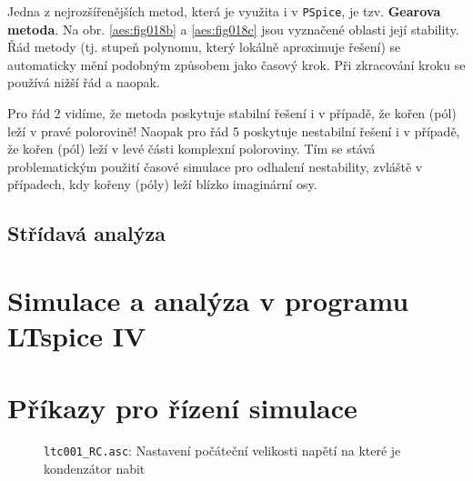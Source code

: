         Jedna z nejrozšířenějších metod, která je využita i v \texttt{PSpice}, je tzv.
        \textbf{Gearova metoda}. Na obr. \ref{aes:fig018b} a \ref{aes:fig018c} jsou
        vyznačené oblasti její stability. Řád metody (tj. stupeň polynomu, který lokálně aproximuje
        řešení) se automaticky mění podobným způsobem jako časový krok. Při zkracování kroku se
        používá nižší řád a naopak.

        Pro řád \num{2} vidíme, že metoda poskytuje stabilní řešení i v případě, že kořen (pól) leží
        v pravé polorovině! Naopak pro řád \num{5} poskytuje nestabilní řešení i v případě, že kořen
        (pól) leží v levé části komplexní poloroviny. Tím se stává problematickým použití časové
        simulace pro odhalení nestability, zvláště v případech, kdy kořeny (póly) leží blízko
        imaginární osy.

        \subsection{Střídavá analýza}



        
  \section{Simulace a analýza v programu LTspice IV}
   
  \section{Příkazy pro řízení simulace}
    
    \begin{figure}[ht!]
      \centering
      \caption{\texttt{ltc001\_RC.asc}: Nastavení počáteční velikosti napětí na které je 
               kondenzátor nabit}
      \label{SPICE:fig_ltc001}
    \end{figure}

